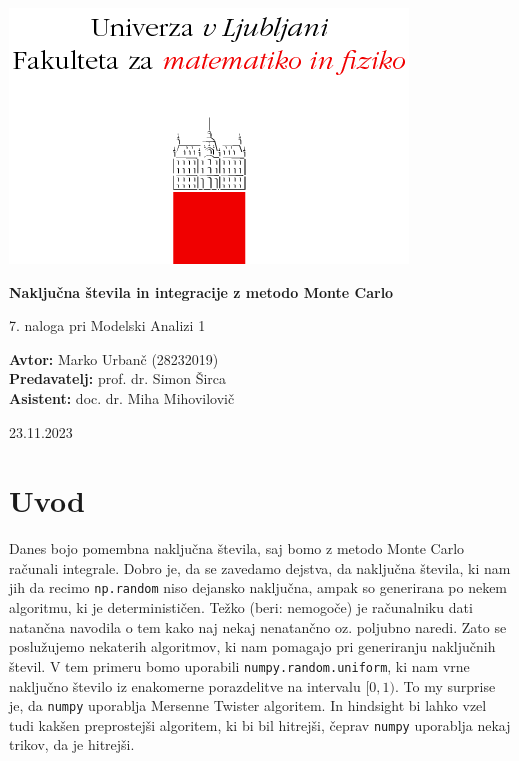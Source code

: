 \documentclass[a4paper]{article}
\begin{document}
\begin{titlepage}
    \begin{center}
        \includegraphics[]{logo.png}
        \vspace*{3cm}
        
        \Huge
        \textbf{Naključna števila in integracije z metodo Monte Carlo}
        
        \vspace{0.5cm}
        \large
        7. naloga pri Modelski Analizi 1

        \vspace{4.5cm}
        
        \textbf{Avtor:} Marko Urbanč (28232019)\ \\
        \textbf{Predavatelj:} prof. dr. Simon Širca\ \\
        \textbf{Asistent:} doc. dr. Miha Mihovilovič\ \\
        
        \vspace{1.8cm}
        
        \large
        23.11.2023
    \end{center}
\end{titlepage}
\tableofcontents
\newpage
\section{Uvod}
Danes bojo pomembna naključna števila, saj bomo z metodo Monte Carlo računali integrale. 
Dobro je, da se zavedamo dejstva, da naključna števila, ki nam jih da recimo \texttt{np.random}
niso dejansko naključna, ampak so generirana po nekem algoritmu, ki je determinističen. Težko (beri: nemogoče) je
računalniku dati natančna navodila o tem kako naj nekaj nenatančno oz. poljubno naredi. Zato se poslužujemo
nekaterih algoritmov, ki nam pomagajo pri generiranju naključnih števil. V tem primeru bomo uporabili
\texttt{numpy.random.uniform}, ki nam vrne naključno število iz enakomerne porazdelitve na intervalu $[0,1)$.
To my surprise je, da \texttt{numpy} uporablja Mersenne Twister algoritem. In hindsight bi lahko vzel tudi kakšen 
preprostejši algoritem, ki bi bil hitrejši, čeprav \texttt{numpy} uporablja nekaj trikov, da je hitrejši. \\
\end{document}
